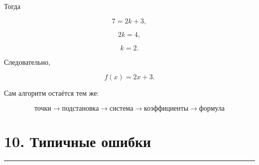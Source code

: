 \documentclass[a4paper,12pt]{article}
\newcommand{\sectionline}{%
    \vspace{0.2em}
    {\color{accent}\rule{\linewidth}{0.7pt}}
    \vspace{0.45em}
}
\begin{document}
Тогда

\[
7=2k+3,
\]

\[
2k=4,
\]

\[
k=2.
\]

Следовательно,

\[
\boxed{f(x)=2x+3}.
\]

Сам алгоритм остаётся тем же:

\[
\boxed{
\text{точки}
\to
\text{подстановка}
\to
\text{система}
\to
\text{коэффициенты}
\to
\text{формула}
}
\]


\section*{\textcolor{darkaccent}{10. Типичные ошибки}}

\sectionline
\end{document}
